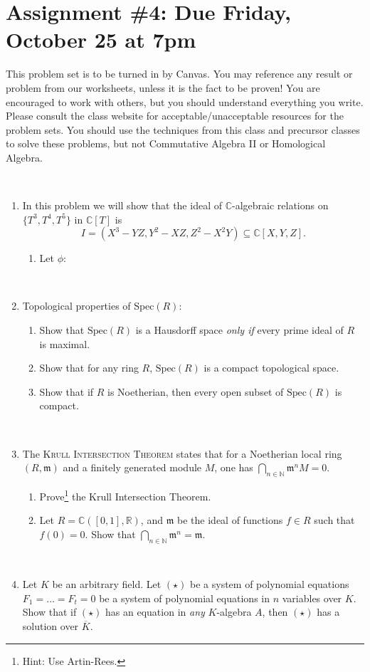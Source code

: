 \documentclass[12pt]{amsart}
\newcommand{\N}{\mathbb{N}}
\newcommand{\R}{\mathbb{R}}
\newcommand{\C}{\mathbb{C}}
\newcommand{\m}{\mathfrak{m}}
\newcommand{\Spec}{\mathrm{Spec}}
\newcommand{\showsol}[1]{\def\displaysol{#1}}
\begin{document}
\showsol{1}
	
	\thispagestyle{empty}
	
	\section*{Assignment \#4: Due Friday, October 25 at 7pm}
	
	This problem set is to be turned in by Canvas. You may reference any result or problem from our worksheets, unless it is the fact to be proven! You are encouraged to work with others, but you should understand everything you write. Please consult the class website for acceptable/unacceptable resources for the problem sets. You should use the techniques from this class and precursor classes to solve these problems, but not Commutative Algebra II or Homological Algebra.
	
	
	\
	
\begin{enumerate}

\item In this problem we will show that the ideal of $\C$-algebraic relations on $\{T^3,T^4,T^5\}$ in $\C[T]$ is
\[ I = ( X^3 - YZ, Y^2-XZ, Z^2-X^2Y) \subseteq \C[X,Y,Z].\]
\begin{enumerate}
\item Let $\phi:$
\end{enumerate}

\


\item Topological properties of $\Spec(R)$:
\begin{enumerate}
\item Show that $\Spec(R)$ is a Hausdorff space \emph{only if} every prime ideal of $R$ is maximal.
\item Show that for any ring $R$, $\Spec(R)$ is a compact topological space.
\item Show that if $R$ is Noetherian, then every open subset of $\Spec(R)$ is compact.
\end{enumerate}

\

\item The \textsc{Krull Intersection Theorem} states that for a Noetherian local ring $(R,\m)$ and a finitely generated module $M$, one has $\bigcap_{n\in\N} \m^{n} M = 0$.
\begin{enumerate}
\item Prove\footnote{Hint: Use Artin-Rees.} the Krull Intersection Theorem.
\item Let $R=\C([0,1],\R)$, and $\m$ be the ideal of functions $f\in R$ such that $f(0)=0$. Show that $\bigcap_{n\in \N} \m^n = \m$.
\end{enumerate}


\

\item Let $K$ be an arbitrary field. Let $(\star)$ be a system of polynomial equations $F_1 = \dots = F_t = 0$ be a system of polynomial equations in $n$ variables over $K$. Show that if $(\star)$ has an equation in \emph{any} $K$-algebra $A$, then $(\star)$ has a solution over $\overline{K}$.



\end{enumerate}
\end{document}
